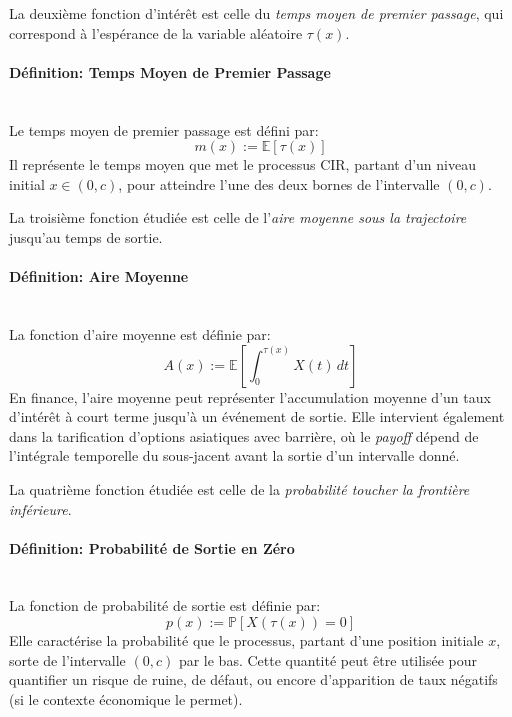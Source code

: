 La deuxième fonction d'intérêt est celle du \textit{temps moyen de premier passage}, qui correspond à l'espérance de la variable aléatoire $\tau(x)$.
\paragraph{Définition: Temps Moyen de Premier Passage}\mbox{}\\
Le temps moyen de premier passage est défini par:
\begin{equation}\label{mean}
    m(x):= \mathds{E}[\tau(x)]
\end{equation}
Il représente le temps moyen que met le processus \acs{CIR}, partant d'un niveau initial $x \in (0,c)$, pour atteindre l'une des deux bornes de l'intervalle $(0,c)$.

La troisième fonction étudiée est celle de l'\textit{aire moyenne sous la trajectoire} jusqu'au temps de sortie.
\paragraph{Définition: Aire Moyenne}\mbox{}\\
La fonction d'aire moyenne est définie par:
\begin{equation}\label{area}
    A(x):= \mathds{E} \left[ \int_0^{\tau(x)} X(t)\,dt \right]
\end{equation}
En finance, l'aire moyenne peut représenter l'accumulation moyenne d'un taux d'intérêt à court terme jusqu'à un événement de sortie. Elle intervient également dans la tarification d'options asiatiques avec barrière, où le \textit{payoff} dépend de l'intégrale temporelle du sous-jacent avant la sortie d'un intervalle donné.

La quatrième fonction étudiée est celle de la \textit{probabilité toucher la frontière inférieure}.
\paragraph{Définition: Probabilité de Sortie en Zéro}\mbox{}\\
La fonction de probabilité de sortie est définie par:
\begin{equation}\label{zero_exit_probability}
    p(x):=\mathds{P}[X(\tau(x))=0]
\end{equation}
Elle caractérise la probabilité que le processus, partant d'une position initiale $x$, sorte de l'intervalle $(0,c)$ par le bas. Cette quantité peut être utilisée pour quantifier un risque de ruine, de défaut, ou encore d'apparition de taux négatifs (si le contexte économique le permet).

